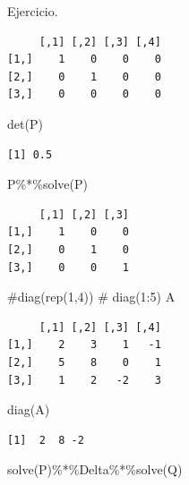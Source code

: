 \documentclass[
  ignorenonframetext,
  aspectratio=169,
  spanish,
]{beamer}
\newenvironment{Shaded}{\begin{snugshade}}{\end{snugshade}}
\newcommand{\CommentTok}[1]{\textcolor[rgb]{0.37,0.37,0.37}{#1}}
\newcommand{\FunctionTok}[1]{\textcolor[rgb]{0.28,0.35,0.67}{#1}}
\newcommand{\NormalTok}[1]{\textcolor[rgb]{0.00,0.23,0.31}{#1}}
\newcommand{\SpecialCharTok}[1]{\textcolor[rgb]{0.37,0.37,0.37}{#1}}
\begin{document}
\begin{frame}[fragile]{}
\begin{block}{Ejercicio.}
\begin{verbatim}
     [,1] [,2] [,3] [,4]
[1,]    1    0    0    0
[2,]    0    1    0    0
[3,]    0    0    0    0
\end{verbatim}

\begin{Shaded}
\begin{Highlighting}[]
\FunctionTok{det}\NormalTok{(P)}
\end{Highlighting}
\end{Shaded}

\begin{verbatim}
[1] 0.5
\end{verbatim}

\begin{Shaded}
\begin{Highlighting}[]
\NormalTok{P}\SpecialCharTok{\%*\%}\FunctionTok{solve}\NormalTok{(P) }
\end{Highlighting}
\end{Shaded}

\begin{verbatim}
     [,1] [,2] [,3]
[1,]    1    0    0
[2,]    0    1    0
[3,]    0    0    1
\end{verbatim}

\begin{Shaded}
\begin{Highlighting}[]
\CommentTok{\#diag(rep(1,4))  }
\CommentTok{\# diag(1:5)}
\NormalTok{A}
\end{Highlighting}
\end{Shaded}

\begin{verbatim}
     [,1] [,2] [,3] [,4]
[1,]    2    3    1   -1
[2,]    5    8    0    1
[3,]    1    2   -2    3
\end{verbatim}

\begin{Shaded}
\begin{Highlighting}[]
\FunctionTok{diag}\NormalTok{(A)}
\end{Highlighting}
\end{Shaded}

\begin{verbatim}
[1]  2  8 -2
\end{verbatim}

\begin{Shaded}
\begin{Highlighting}[]
\FunctionTok{solve}\NormalTok{(P)}\SpecialCharTok{\%*\%}\NormalTok{Delta}\SpecialCharTok{\%*\%}\FunctionTok{solve}\NormalTok{(Q) }
\end{Highlighting}
\end{Shaded}


\end{block}
\end{frame}
\end{document}
